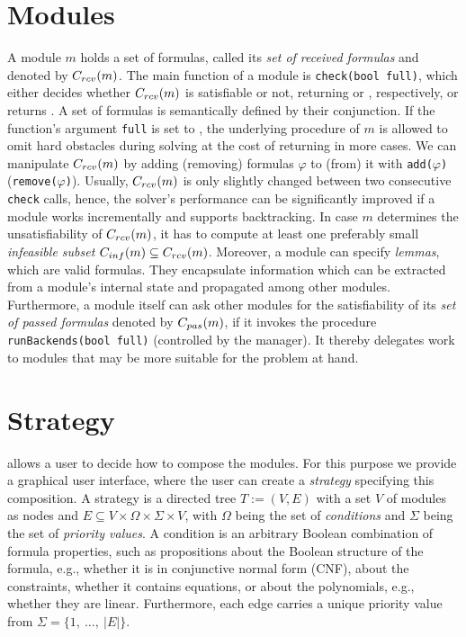 \section{Modules}
A module $m$ holds a set of formulas, called its \emph{set of received formulas} and denoted by $C_{rcv}(m)$. The main function of a module is \texttt{check(bool full)}, which either decides whether $C_{rcv}(m)$ is satisfiable or not, returning \SAT or \UNSAT, respectively, or returns \UNKNOWN. A set of formulas is semantically defined by their conjunction. If the function's argument \texttt{full} is set to \false, the underlying procedure of $m$ is allowed to omit hard obstacles during solving at the cost of returning \UNKNOWN in more cases. We can manipulate $C_{rcv}(m)$ by adding (removing) formulas $\varphi$ to (from) it with \texttt{add($\varphi$)} (\texttt{remove($\varphi$)}). Usually, $C_{rcv}(m)$ is only slightly changed between two consecutive \texttt{check} calls, hence, the solver's performance can be significantly improved if a module works incrementally and supports backtracking. In case $m$ determines the unsatisfiability of $C_{rcv}(m)$, it has to compute at least one preferably small \emph{infeasible subset} $C_{inf}(m)\subseteq C_{rcv}(m)$. Moreover, a module can specify \emph{lemmas}, which are valid formulas. They encapsulate information which can be extracted from a module's internal state and propagated among other modules. Furthermore, a module itself can ask other modules for the satisfiability of its \emph{set of passed formulas} denoted by $C_{pas}(m)$, if it invokes the procedure \texttt{runBackends(bool full)} (controlled by the manager). It thereby delegates work to modules that	 may be more suitable for the problem at hand. 

\section{Strategy}
\label{sec::strategy}
\smtrat allows a user to decide how to compose the modules. For this purpose we provide a graphical user interface, where the user can create a \emph{strategy} specifying this composition. A strategy is a directed tree $T:=(V, E)$ with a set $V$ of modules as nodes and $E\subseteq V\times \Omega\times\Sigma\times V$, with $\Omega$ being the set of \emph{conditions} and $\Sigma$ being the set of \emph{priority values}. A condition is an arbitrary Boolean combination of formula properties, such as propositions about the Boolean structure of the formula, e.g., whether it is in conjunctive normal form (CNF), about the constraints, \eg whether it contains equations, or about the polynomials, e.g., whether they are linear. Furthermore, each edge carries a unique priority value from $\Sigma=\{1,\ \ldots,\ |E|\}$.

